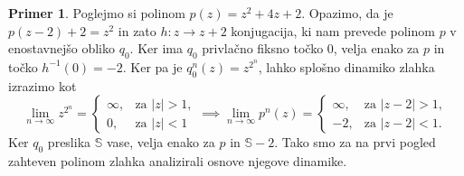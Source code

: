 \documentclass[12pt,a4paper]{amsart}
\theoremstyle{definition} %
\newtheorem{primer}[definicija]{Primer}
\theoremstyle{plain} %
\newcommand{\SSS}{\mathbb S} %
\begin{document}
\begin{primer}\label{primer:QuadTranslation}
Poglejmo si polinom $p(z) = z^2 + 4z + 2$. 
Opazimo, da je $p(z - 2) + 2 = z^2$ in zato $h \colon z \to z + 2$ konjugacija, 
ki nam prevede polinom $p$ v enostavnejšo obliko $q_0$.
Ker ima  $q_0$ privlačno fiksno točko $0$, velja enako za $p$ in točko $h^{-1}(0) = -2$.
Ker pa je $q_0^n(z) = z^{2^n}$, lahko splošno dinamiko zlahka izrazimo kot
\begin{equation*}
    \lim_{n\to\infty} z^{2^n} = 
\begin{cases}
    \infty, 	        & \text{za }|z| > 1, \\
    0,                      & \text{za }|z| < 1
\end{cases}
\implies
\lim_{n\to\infty} p^n(z) =
\begin{cases}
    \infty, 	        & \text{za }|z - 2| > 1, \\
    -2,                     & \text{za }|z - 2| < 1.
\end{cases}
\end{equation*}
Ker $q_0$ preslika $\SSS$ vase, velja enako za $p$ in $\SSS - 2$.
Tako smo za na prvi pogled zahteven polinom zlahka analizirali osnove njegove dinamike.
\end{primer}
\end{document}
